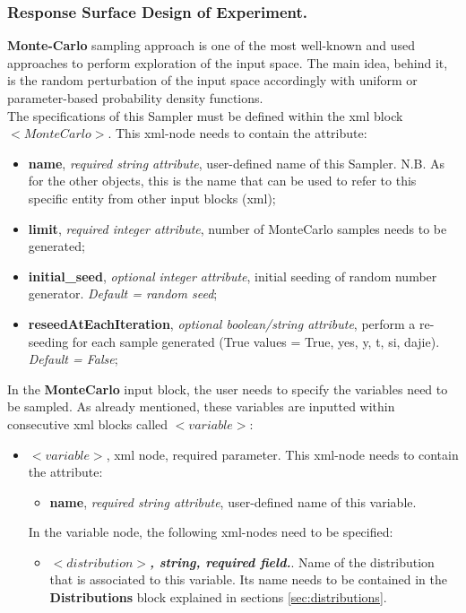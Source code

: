 \subsubsection{Response Surface Design of Experiment.}
\label{subsubsubsec:RespSurfDOE}
\textbf{Monte-Carlo} sampling approach is one of the most well-known and used approaches to perform exploration of the input space. The main idea, behind it, is the random perturbation of the input space accordingly with uniform or parameter-based probability density functions. 
\\ The specifications of this Sampler must be defined within the xml block $<MonteCarlo>$. This xml-node needs to contain the attribute:
\vspace{-5mm}
\begin{itemize}
\itemsep0em
\item \textbf{name}, \textit{required string attribute}, user-defined name of this Sampler. N.B. As for the other objects, this is the name that can be used to refer to this specific entity from other input blocks (xml);
\item \textbf{limit}, \textit{required integer attribute}, number of MonteCarlo samples needs to be generated;
\item \textbf{initial\_seed}, \textit{optional integer attribute}, initial seeding of random number generator. \textit{Default = random seed};
\item \textbf{reseedAtEachIteration}, \textit{optional boolean/string attribute}, perform a re-seeding for each sample generated (True values = True, yes, y, t, si, dajie). \textit{Default = False}; 
\end{itemize}
\vspace{-5mm}
In the \textbf{MonteCarlo} input block, the user needs to specify the variables need to be sampled. As already mentioned, these variables are inputted within consecutive xml blocks called $<variable>$:
\begin{itemize}
\item $<variable>$, xml node, required parameter. This xml-node needs to contain the attribute:
\begin{itemize}
  \item \textbf{name}, \textit{required string attribute}, user-defined name of this variable. 
\end{itemize}
 In the variable node, the following xml-nodes need to be specified:
 \begin{itemize}
    \item $<distribution>$\textbf{\textit{, string, required field.}}. Name of the distribution that is associated to this variable. Its name needs to be contained in the \textbf{Distributions} block explained in sections \ref{sec:distributions}.
  \end{itemize}
\end{itemize}

